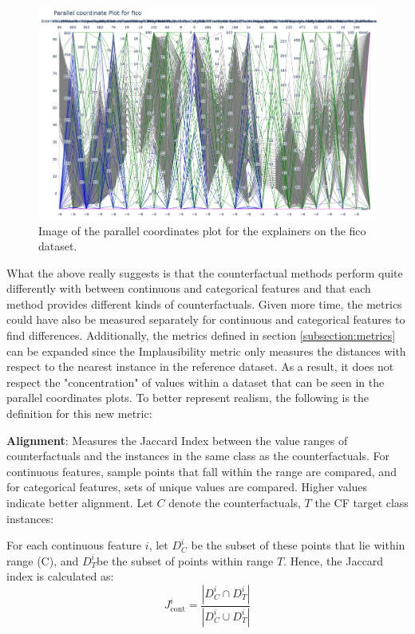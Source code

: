\begin{figure}[!htbp]
    \centering
    \includegraphics[width=\textwidth]{images/pcp-fico.png}
    \caption{Image of the parallel coordinates plot for the explainers on the fico dataset.}
    \label{fig:pcp-fico}
\end{figure}

What the above really suggests is that the counterfactual methods perform quite differently with between continuous and categorical features and that each method provides different kinds of counterfactuals. Given more time, the metrics could have also be measured separately for continuous and categorical features to find differences. Additionally, the metrics defined in section \ref{subsection:metrics} can be expanded since the Implausibility metric only measures the distances with respect to the nearest instance in the reference dataset. As a result, it does not respect the "concentration" of values within a dataset that can be seen in the parallel coordinates plots. To better represent realism, the following is the definition for this new metric:

\textbf{Alignment}: Measures the Jaccard Index between the value ranges of counterfactuals and the instances in the same class as the counterfactuals. For continuous features, sample points that fall within the range are compared, and for categorical features, sets of unique values are compared. Higher values indicate better alignment. Let \(C\) denote the counterfactuals, \(T\) the CF target class instances:

For each continuous feature \( i \), let \(D_C^i\) be the subset of these points that lie within range (C), and \(D_T^i\)be the subset of points within range \(T\). Hence, the Jaccard index is calculated as:
\begin{equation}
J_{\text{cont}}^{i} =  \frac{|D_C^i \cap D_T^i|}{|D_C^i \cup D_T^i|}
\end{equation}

